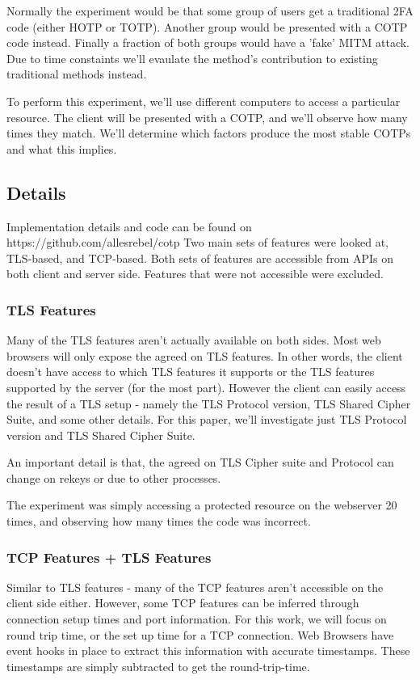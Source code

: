 \documentclass[a4paper, 11pt]{article} 				%
\begin{document}
Normally the experiment would be that some group of users get a traditional 2FA code (either HOTP or TOTP). Another group would be presented with a COTP code instead. Finally a fraction of both groups would have a 'fake' MITM attack. Due to time constaints we'll evaulate the method's contribution to existing traditional methods instead.

To perform this experiment, we'll use different computers to access a particular resource. The client will be presented with a COTP, and we'll observe how many times they match. We'll determine which factors produce the most stable COTPs and what this implies.

\subsection{Details}
Implementation details and code can be found on https://github.com/allesrebel/cotp
Two main sets of features were looked at, TLS-based, and TCP-based. Both sets of features are accessible from APIs on both client and server side. Features that were not accessible were excluded. 

\subsubsection{TLS Features}
Many of the TLS features aren't actually available on both sides. Most web browsers will only expose the agreed on TLS features. In other words, the client doesn't have access to which TLS features it supports or the TLS features supported by the server (for the most part). However the client can easily access the result of a TLS setup - namely the TLS Protocol version, TLS Shared Cipher Suite, and some other details. For this paper, we'll investigate just TLS Protocol version and TLS Shared Cipher Suite. 

An important detail is that, the agreed on TLS Cipher suite and Protocol can change on rekeys or due to other processes. 

The experiment was simply accessing a protected resource on the webserver 20 times, and observing how many times the code was incorrect.

\subsubsection{TCP Features + TLS Features}
Similar to TLS features - many of the TCP features aren't accessible on the client side either. However, some TCP features can be inferred through connection setup times and port information. For this work, we will focus on round trip time, or the set up time for a TCP connection. Web Browsers have event hooks in place to extract this information with accurate timestamps. These timestamps are simply subtracted to get the round-trip-time. 
\end{document}
